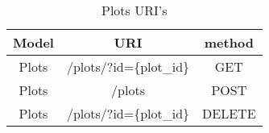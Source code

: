 \begin{table}[]
\centering
\begin{tabular}{|c|c|c|}
\hline
\rowcolor[HTML]{32CB00} 
\textbf{Model} & \textbf{URI}            & \textbf{method} \\ \hline
\rowcolor[HTML]{FFFFFF} 
Plots          & /plots/?id=\{plot\_id\} & GET             \\ \hline
\rowcolor[HTML]{67FD9A} 
Plots          & /plots                  & POST            \\ \hline
\rowcolor[HTML]{FFFFFF} 
Plots          & /plots/?id=\{plot\_id\} & DELETE          \\ \hline
\end{tabular}
\caption{Plots URI's}
\label{plotsURI}
\end{table}


